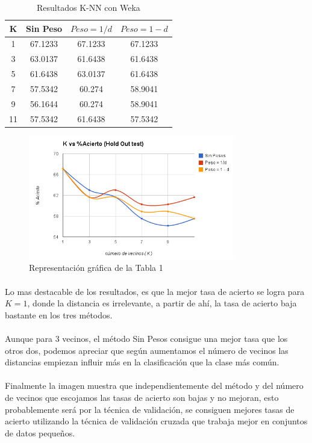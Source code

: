 \documentclass[es]{ifirak}
\begin{document}
\begin{table}[htbp]
\centering
\begin{tabular}{c|c|c|c}
K & Sin Peso &$ Peso = 1/d$ & $Peso = 1-d$\\
\hline
1 & 67.1233 & 67.1233 & 67.1233\\
3 & 63.0137 & 61.6438 & 61.6438\\
5 & 61.6438 & 63.0137 & 61.6438\\
7 & 57.5342 & 60.274 & 58.9041\\
9 & 56.1644 & 60.274 & 58.9041\\
11 & 57.5342 & 61.6438 & 57.5342\\
\end{tabular}
\caption{Resultados K-NN con Weka}\label{table}
\end{table}

\begin{figure}[htbp]
\centering
\includegraphics[width=0.8\textwidth]{1kvsAciertos.png}
\caption{Representación gráfica de la Tabla 1}\label{figure}
\end{figure}

\paragraph{}
Lo mas destacable de los resultados, es que la mejor tasa de acierto se logra para $K  = 1$, donde la distancia es irrelevante, a partir de ahí, la tasa de acierto baja bastante en los tres métodos. 
\paragraph{}
Aunque para 3 vecinos, el método Sin Pesos consigue una mejor tasa que los otros dos, podemos apreciar que según aumentamos el número de vecinos las distancias empiezan influir más en la clasificación que la clase más común. 
\paragraph{}
Finalmente la imagen muestra que independientemente del método y del número de vecinos que escojamos las tasas de acierto son bajas y no mejoran, esto probablemente será por la técnica de validación, se consiguen mejores tasas de acierto utilizando la técnica de validación cruzada que trabaja mejor en conjuntos de datos pequeños.
\end{document}
